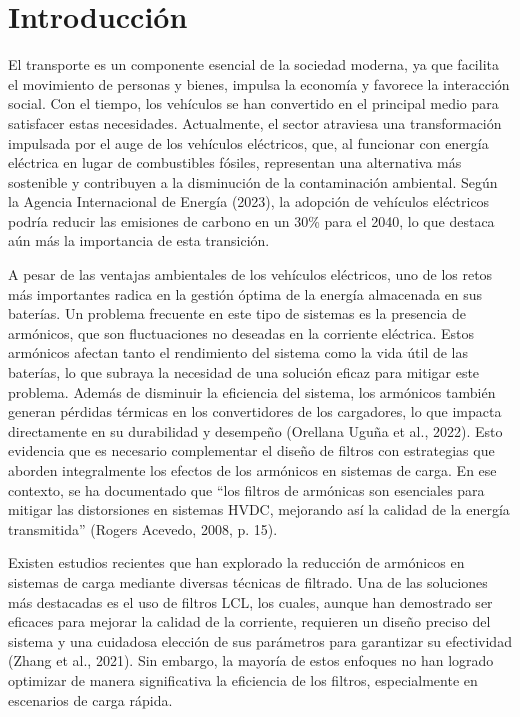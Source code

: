 \section{Introducción}

El transporte es un componente esencial de la sociedad moderna, ya que facilita el movimiento de personas y bienes, impulsa la economía y favorece la interacción social. Con el tiempo, los vehículos se han convertido en el principal medio para satisfacer estas necesidades. Actualmente, el sector atraviesa una transformación impulsada por el auge de los vehículos eléctricos, que, al funcionar con energía eléctrica en lugar de combustibles fósiles, representan una alternativa más sostenible y contribuyen a la disminución de la contaminación ambiental. Según la Agencia Internacional de Energía (2023), la adopción de vehículos eléctricos podría reducir las emisiones de carbono en un 30\% para el 2040, lo que destaca aún más la importancia de esta transición.

A pesar de las ventajas ambientales de los vehículos eléctricos, uno de los retos más importantes radica en la gestión óptima de la energía almacenada en sus baterías. Un problema frecuente en este tipo de sistemas es la presencia de armónicos, que son fluctuaciones no deseadas en la corriente eléctrica. Estos armónicos afectan tanto el rendimiento del sistema como la vida útil de las baterías, lo que subraya la necesidad de una solución eficaz para mitigar este problema. Además de disminuir la eficiencia del sistema, los armónicos también generan pérdidas térmicas en los convertidores de los cargadores, lo que impacta directamente en su durabilidad y desempeño (Orellana Uguña et al., 2022). Esto evidencia que es necesario complementar el diseño de filtros con estrategias que aborden integralmente los efectos de los armónicos en sistemas de carga. En ese contexto, se ha documentado que ``los filtros de armónicas son esenciales para mitigar las distorsiones en sistemas HVDC, mejorando así la calidad de la energía transmitida'' (Rogers Acevedo, 2008, p. 15).

Existen estudios recientes que han explorado la reducción de armónicos en sistemas de carga mediante diversas técnicas de filtrado. Una de las soluciones más destacadas es el uso de filtros LCL, los cuales, aunque han demostrado ser eficaces para mejorar la calidad de la corriente, requieren un diseño preciso del sistema y una cuidadosa elección de sus parámetros para garantizar su efectividad (Zhang et al., 2021). Sin embargo, la mayoría de estos enfoques no han logrado optimizar de manera significativa la eficiencia de los filtros, especialmente en escenarios de carga rápida.

